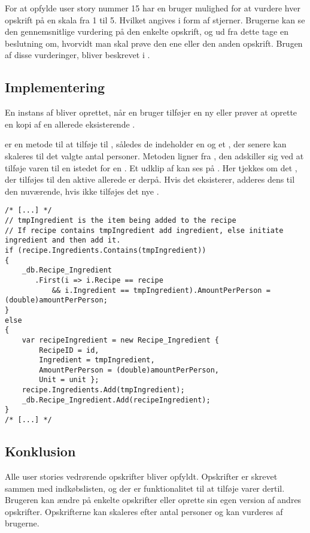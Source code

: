 For at opfylde user story nummer 15 har en bruger mulighed for at vurdere hver opskrift på en skala fra 1 til 5.
Hvilket angives i form af stjerner.
Brugerne kan se den gennemsnitlige vurdering på den enkelte opskrift, og ud fra dette tage en beslutning om, hvorvidt man skal prøve den ene eller den anden opskrift.
Brugen af disse vurderinger, bliver beskrevet i .

\subsection{Implementering}
En instans af  bliver oprettet, når en bruger tilføjer en ny  eller prøver at oprette en kopi af en allerede eksisterende .

 er en metode til at tilføje  til , således de indeholder en  og et , der senere kan skaleres til det valgte antal personer. 
Metoden ligner  fra , den adskiller sig ved at tilføje varen til en  istedet for en .
Et udklip af  kan ses på .
Her tjekkes om det , der tilføjes til den aktive  allerede er derpå. 
Hvis det eksisterer, adderes dens  til den nuværende, hvis ikke tilføjes det nye .

\begin{lstlisting}[caption={Udklip fra \class{AddIngredient}},label=addIngredient]
/* [...] */      
// tmpIngredient is the item being added to the recipe
// If recipe contains tmpIngredient add ingredient, else initiate ingredient and then add it.
if (recipe.Ingredients.Contains(tmpIngredient))
{
    _db.Recipe_Ingredient
       .First(i => i.Recipe == recipe 
       	   && i.Ingredient == tmpIngredient).AmountPerPerson = (double)amountPerPerson;
}
else
{
    var recipeIngredient = new Recipe_Ingredient { 
    	RecipeID = id, 
    	Ingredient = tmpIngredient, 
    	AmountPerPerson = (double)amountPerPerson, 
    	Unit = unit };
    recipe.Ingredients.Add(tmpIngredient);
    _db.Recipe_Ingredient.Add(recipeIngredient);
}
/* [...] */          
\end{lstlisting}


\subsection{Konklusion}
Alle user stories vedrørende opskrifter bliver opfyldt. 
Opskrifter er skrevet sammen med indkøbslisten, og der er funktionalitet til at tilføje varer dertil. 
Brugeren kan ændre på enkelte opskrifter eller oprette sin egen version af andres opskrifter. 
Opskrifterne kan skaleres efter antal personer og kan vurderes af brugerne. 
